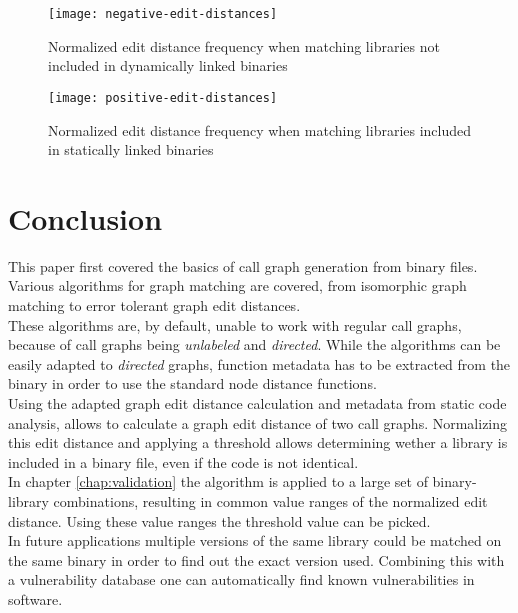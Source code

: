 \documentclass[
    12pt,                               %
    DIV=14,                     %
    parskip=half+,              %
    bigheadings,                %
    cleardoubleempty,   %
    halfparskip,                %
    ]{scrreprt} %
\begin{document}
\begin{figure}[H]
	\centering
	\texttt{[image: negative-edit-distances]}
	\caption{Normalized edit distance frequency when matching libraries not included in dynamically linked binaries}
	\label{fig:validation:negatives}
\end{figure}

\begin{figure}[H]
	\centering
	\texttt{[image: positive-edit-distances]}
	\caption{Normalized edit distance frequency when matching libraries included in statically linked binaries}
	\label{fig:validation:positives}
\end{figure}


\chapter{Conclusion}
This paper first covered the basics of call graph generation from binary files. Various algorithms for graph matching are covered, from isomorphic graph matching to error tolerant graph edit distances. \\
These algorithms are, by default, unable to work with regular call graphs, because of call graphs being \textit{unlabeled} and \textit{directed}. While the algorithms can be easily adapted to \textit{directed} graphs, function metadata has to be extracted from the binary in order to use the standard node distance functions. \\
Using the adapted graph edit distance calculation and metadata from static code analysis, allows to calculate a graph edit distance of two call graphs. Normalizing this edit distance and applying a threshold allows determining wether a library is included in a binary file, even if the code is not identical. \\
In chapter \ref{chap:validation} the algorithm is applied to a large set of binary-library combinations, resulting in common value ranges of the normalized edit distance. Using these value ranges the threshold value can be picked. \\
In future applications multiple versions of the same library could be matched on the same binary in order to find out the exact version used. Combining this with a vulnerability database one can automatically find known vulnerabilities in software.
\end{document}
